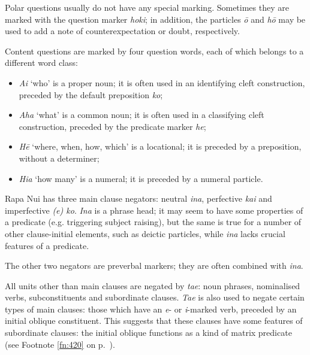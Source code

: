 Polar questions usually do not have any special marking. Sometimes they are marked with the question marker \textit{hoki}; in addition, the particles \textit{{\ꞌ}ō} and \textit{hō} may be used to add a note of counterexpectation or doubt, respectively.

Content questions are marked by four question words, each of which belongs to a different word class:

\begin{itemize}
\item 
\textit{Ai} ‘who’ is a proper noun; it is often used in an identifying cleft construction, preceded by the default preposition \textit{ko};

\item 
\textit{Aha} ‘what’ is a common noun; it is often used in a classifying cleft construction, preceded by the predicate marker \textit{he};

\item 
\textit{Hē} ‘where, when, how, which’ is a locational; it is preceded by a preposition, without a determiner;

\item 
\textit{Hia} ‘how many’ is a numeral; it is preceded by a numeral particle.

\end{itemize}

Rapa Nui has three main clause negators: neutral \textit{{\ꞌ}ina}, perfective \textit{kai} and imperfective \textit{(e) ko}. \textit{{\ꞌ}Ina} is a phrase head; it may seem to have some properties of a predicate (e.g. triggering subject raising), but the same is true for a number of other clause-initial elements, such as deictic particles, while \textit{{\ꞌ}ina} lacks crucial features of a predicate.

The other two negators are preverbal markers; they are often combined with \textit{{\ꞌ}ina}.

All units other than main clauses are negated by \textit{ta{\ꞌ}e}: noun phrases, nominalised verbs, subconstituents and subordinate clauses. \textit{Ta{\ꞌ}e} is also used to negate certain types of main clauses: those which have an \textit{e}{}- or \textit{i}{}-marked verb, preceded by an initial oblique constituent. This suggests that these clauses have some features of subordinate clauses: the initial oblique functions as a kind of matrix predicate (see Footnote \ref{fn:420} on p.~\pageref{fn:420}).
